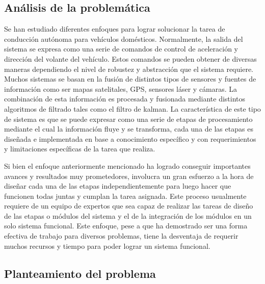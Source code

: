 \documentclass[12pt,letterpaper]{article}
\begin{document}
\subsection{Análisis de la problemática}

Se han estudiado diferentes enfoques para lograr solucionar la tarea de 
conducción autónoma para vehículos domésticos. Normalmente, la salida del 
sistema se expresa como una serie de comandos de control de aceleración y dirección 
del volante del vehículo. Estos comandos se pueden obtener de diversas maneras dependiendo 
el nivel de robustez y abstracción que el sistema requiere. Muchos sistemas 
se basan en la fusión de distintos tipos de sensores y fuentes de información como ser 
mapas satelitales, GPS, sensores láser y cámaras. La combinación de esta información 
es procesada y fusionada mediante distintos algoritmos de filtrado tales como el filtro de kalman. 
La característica de este tipo de sistema es que se puede expresar como una serie de etapas 
de procesamiento mediante el cual la información fluye y se transforma, cada una de las etapas es 
diseñada e implementada en base a conocimiento específico y con requerimientos y limitaciones específicas 
de la tarea que realiza. 

Si bien el enfoque anteriormente mencionado ha logrado conseguir importantes avances y resultados 
muy prometedores, involucra un gran esfuerzo a la hora de diseñar cada una de las etapas independientemente 
para luego hacer que funcionen todas juntas y cumplan la tarea asignada. Este proceso usualmente requiere 
de un equipo de expertos que sea capaz de realizar las tareas de diseño de las etapas o módulos del sistema 
y el de la integración de los módulos en un solo sistema funcional. Este enfoque, pese a que ha demostrado ser 
una forma efectiva de trabajo para diversos problemas, tiene la desventaja de requerir muchos 
recursos y tiempo para poder lograr un sistema funcional. 



\subsection{Planteamiento del problema}
\end{document}
